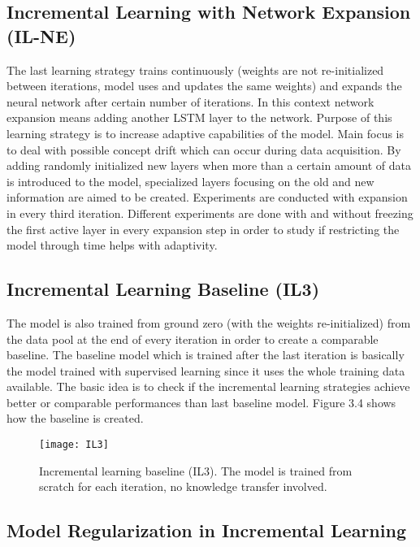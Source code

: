 \subsection{Incremental Learning with Network Expansion (IL-NE)}

The last learning strategy trains continuously (weights are not re-initialized between iterations, model uses and updates the same weights) and expands the neural network after certain number of iterations. In this context network expansion means adding another LSTM layer to the network. Purpose of this learning strategy is to increase adaptive capabilities of the model. Main focus is to deal with possible concept drift which can occur during data acquisition. By adding randomly initialized new layers when more than a certain amount of data is introduced to the model, specialized layers focusing on the old and new information are aimed to be created. Experiments are conducted with expansion in every third iteration. Different experiments are done with and without freezing the first active layer in every expansion step in order to study if restricting the model through time helps with adaptivity.   

\subsection{Incremental Learning Baseline (IL3)}

The model is also trained from ground zero (with the weights re-initialized) from the data pool at the end of every iteration in order to create a comparable baseline. The baseline model which is trained after the last iteration is basically the model trained with supervised learning since it uses the whole training data available. The basic idea is to check if the incremental learning strategies achieve better or comparable performances than last baseline model. Figure 3.4 shows how the baseline is created.

\begin{figure}[t]
\texttt{[image: IL3]}
\centering
\caption{Incremental learning baseline (IL3). The model is trained from scratch for each iteration, no knowledge transfer involved.}
\end{figure}

\subsection{Model Regularization in Incremental Learning}

